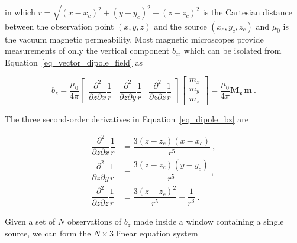 \noindent
in which $r = \sqrt{(x - x_c)^2 + (y - y_c)^2 + (z - z_c)^2}$ is the Cartesian
distance between the observation point $(x, y, z)$ and the source $(x_c, y_c,
z_c)$ and $\mu_0$ is the vacuum magnetic permeability. Most magnetic
microscopes provide measurements of only the vertical component $b_z$, which
can be isolated from Equation~\ref{eq_vector_dipole_field} as

\begin{equation}
\label{eq_dipole_bz}
b_z
= \dfrac{\mu_0}{4\pi}
\begin{bmatrix}
\dfrac{\partial^2}{\partial z \partial x} \dfrac{1}{r}
& \dfrac{\partial^2}{\partial z \partial y} \dfrac{1}{r}
& \dfrac{\partial^2}{\partial z \partial z} \dfrac{1}{r}
\end{bmatrix}
\begin{bmatrix}
m_x \\ m_y \\ m_z
\end{bmatrix}
= \dfrac{\mu_0}{4\pi} \mathbf{M_z}\,\mathbf{m}
\ .
\end{equation}

The three second-order derivatives in Equation~\ref{eq_dipole_bz} are

\begin{equation}
\begin{aligned}
\dfrac{\partial^2}{\partial z \partial x} \dfrac{1}{r} &=
\dfrac{3(z - z_c)(x - x_c)}{r^5}\ ,
\\
\dfrac{\partial^2}{\partial z \partial y} \dfrac{1}{r} &=
\dfrac{3(z - z_c)(y - y_c)}{r^5}\ ,
\\
\dfrac{\partial^2}{\partial z \partial z} \dfrac{1}{r} &=
\dfrac{3(z - z_c)^2}{r^5} - \dfrac{1}{r^3}\ .
\end{aligned}
\end{equation}

Given a set of $N$ observations of $b_z$ made inside a window containing a
single source, we can form the $N \times 3$ linear equation system

